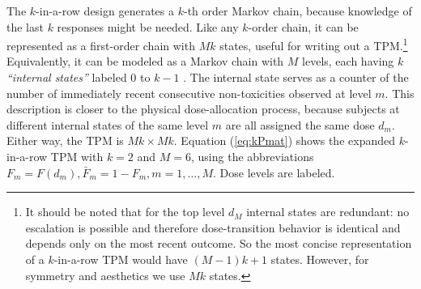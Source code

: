 The $k$-in-a-row design generates a $k$-th order Markov chain, because knowledge of the last $k$ responses might be needed. Like any $k$-order chain, it can be represented as a first-order chain with $Mk$ states, useful for writing out a TPM.\footnote{It should be noted that for the top level $d_M$ internal states are redundant: no escalation is possible and therefore dose-transition behavior is identical and depends only on the most recent outcome. So the most concise representation of a $k$-in-a-row TPM would have $(M-1)k+1$ states. However, for symmetry and aesthetics we use $Mk$ states.} Equivalently,  it can be modeled as a Markov chain with $M$ levels, each having $k$ \emph{``internal states''} labeled $0$ to $k-1$ \citep{Oron:Hoff:thek:2009,Weiss:Aspe:1994}. The internal state serves as a counter of the number of immediately recent consecutive non-toxicities observed at level $m$. This description is closer to the physical dose-allocation process, because subjects at different internal states of the same level $m$ are all assigned the same dose $d_m$. Either way, the TPM is $Mk\times Mk$. Equation (\ref{eq:kPmat}) shows the expanded $k$-in-a-row TPM with $k=2$ and $M=6$, using the abbreviations $F_m=F\left(d_m\right),\bar{F}_m=1-F_m, m=1,\ldots,M$. Dose levels are labeled.

